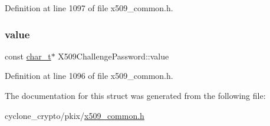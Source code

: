 Definition at line 1097 of file x509\+\_\+common.\+h.

\mbox{\label{structX509ChallengePassword_a1336a40b4d952be8d6689fea03e28a01}} 
\subsubsection{\texorpdfstring{value}{value}}
{\footnotesize\ttfamily const \hyperlink{compiler__port_8h_a40bb5262bf908c328fbcfbe5d29d0201}{char\+\_\+t}$\ast$ X509\+Challenge\+Password\+::value}



Definition at line 1096 of file x509\+\_\+common.\+h.



The documentation for this struct was generated from the following file\+:\begin{DoxyCompactItemize}
\item 
cyclone\+\_\+crypto/pkix/\hyperlink{pkix_2x509__common_8h}{x509\+\_\+common.\+h}\end{DoxyCompactItemize}
